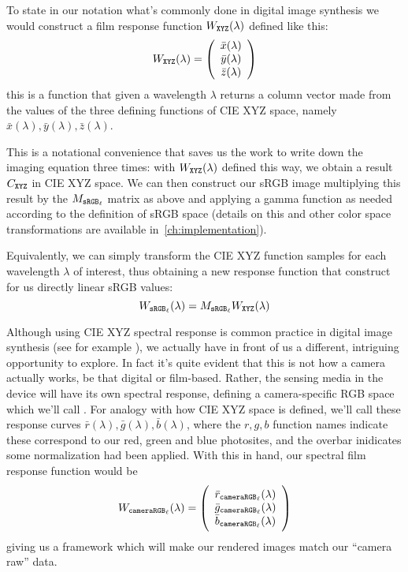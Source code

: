 To state in our notation what's commonly done in digital image synthesis 
we would construct a film response function $W_{\texttt{XYZ}}(\lambda)$ defined 
like this:
\begin{equation}
	W_{\texttt{XYZ}}(\lambda) = 
	\left(
	  \begin{array}{c}
	  	  \bar x(\lambda)\\ 
	  	  \bar y(\lambda)\\ 
	  	  \bar z(\lambda)
	  \end{array}
	\right)
\end{equation}
this is a function that given a wavelength $\lambda$ returns a column vector
made from the values of the three defining functions of \gls{CIE} \gls{XYZ} space,
namely $\bar x(\lambda), \bar y(\lambda), \bar z(\lambda)$.

This is a notational convenience that saves us the work to write down the
imaging equation three times: with $W_{\texttt{XYZ}}(\lambda)$ defined this way,
we obtain a result $C_{\texttt{XYZ}}$ in \gls{CIE} \gls{XYZ} space.
We can then construct our \gls{sRGB} image multiplying this result by
the $M_{\texttt{sRGB}_\ell}$ matrix as above and applying a gamma function as needed
according to the definition of \gls{sRGB} space (details on this and other 
color space transformations are available in~\cref{ch:implementation}).

Equivalently, we can simply transform the \gls{CIE} \gls{XYZ} function
samples for each wavelength $\lambda$ of interest, thus obtaining a new 
response function that construct for us directly linear \gls{sRGB} values:
\begin{displaymath}
 W_{\texttt{sRGB}_\ell}(\lambda) = M_{\texttt{sRGB}_\ell} W_{\texttt{XYZ}}(\lambda)
\end{displaymath}


Although using \gls{CIE} \gls{XYZ} spectral response is common practice
in digital image synthesis (see for example \cite{pharr2023, jakob2022mitsuba3,
ward1994}), we actually have in front of us a different, intriguing opportunity
to explore. 
In fact it's quite evident that this is not how a camera actually works,
be that digital or film-based. 
Rather, the sensing media in the device will have its own spectral response,
defining a camera-specific \gls{RGB} space which we'll call \camRGBl.
For analogy with how \gls{CIE} \gls{XYZ} space is defined, we'll call these
response curves $\bar r(\lambda), \bar g(\lambda), \bar b(\lambda)$, where the 
$r,g,b$ function names indicate these correspond to our red, green and blue photosites, and
the overbar inidicates some normalization had been applied.
With this in hand, our spectral film response function would be
\begin{equation}
	W_{\texttt{cameraRGB}_\ell}(\lambda) = 
	\left(
	\begin{array}{c}
		\bar r_{\texttt{cameraRGB}_\ell}(\lambda) \\
		\bar g_{\texttt{cameraRGB}_\ell}(\lambda) \\
		\bar b_{\texttt{cameraRGB}_\ell}(\lambda)
	\end{array}
	\right)
\end{equation}
giving us a framework which will make our rendered images match our ``camera raw'' 
data.

